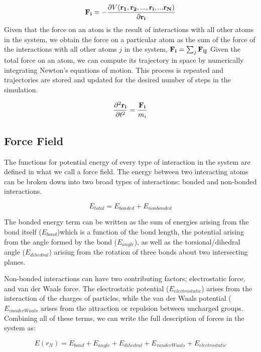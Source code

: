 \begin{equation}
\mathbf{F_i}  = -\frac{\partial V(\mathbf{r_1}, \mathbf{r_2}, ..., \mathbf{r_i}, ... \mathbf{r_N)}}{\partial \mathbf{r_i}} 
 \end{equation}
 Given that the force on an atom is the result of interactions with all other atoms in the system, we obtain the force on a particular atom as the sum of the force of the interactions with all other atoms $j$ in the system,  $\mathbf{F_i} = \sum_{j} \mathbf{F_{ij}}$ Given the total force on an atom, we can compute its trajectory in space by numerically integrating Newton's equations of motion. This process is repeated and trajectories are stored and updated for the desired number of steps in the simulation.
 
 \begin{equation}
 \frac{\partial^2 \mathbf{r_{i}}}{\partial t^2} = \frac{\mathbf{F_i}}{m_i}
\end{equation}

\subsection{Force Field}

The functions for potential energy of every type of interaction in the system are defined in what we call a force field. The energy between two interacting atoms can be broken down into two broad types of interactions: bonded and non-bonded interactions.

\begin{equation}
E_{total} = E_{bonded} + E_{non bonded}
\end{equation}

The bonded energy term can be written as the sum of energies arising from the bond itself  ($E_{bond}$)which is a function of the bond length, the potential arising from the angle formed by the bond ($E_{angle}$), as well as the torsional/dihedral angle ($E_{dihedral}$) arising from the rotation of three bonds about two intersecting planes.

Non-bonded interactions can have two contributing factors; electrostatic force, and van der Waals force. The electrostatic potential ($E_{electrostatic}$) arises from the interaction of the charges of particles, while the van der Waals potential  ($E_{van der Waals}$ arises from the attraction or repulsion between uncharged groups. Combining all of these terms, we can write the full description of forces in the system as:

\begin{equation}
E(r_{N}) = E_{bond} + E_{angle} + E_{dihedral} + E_{van der Waals} + E_{electrostatic} 
\end{equation}



